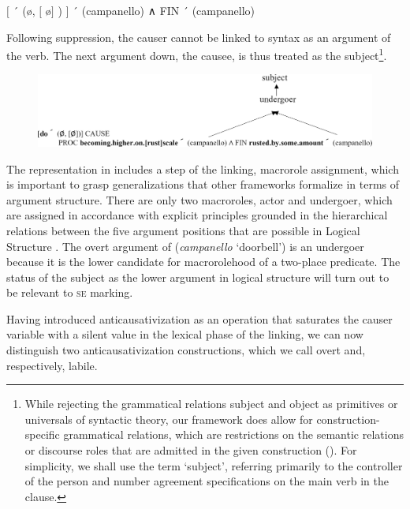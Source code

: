 \documentclass[output=paper,colorlinks,citecolor=brown
]{langscibook}
\begin{document}
\ea  \label{bentley_example_50}
    $\lbrack$ ´ (\o, $\lbrack$ \o $\rbrack$ ) $\rbrack$ ´ (campanello) ∧ FIN ´ (campanello)
\z

Following suppression, the causer cannot be linked to syntax as an argument of the verb. The next argument down, the causee, is thus treated as the subject\footnote{While rejecting the grammatical relations subject and object as primitives or universals of syntactic theory, our framework does allow for construction-specific grammatical relations, which are restrictions on the semantic relations or discourse roles that are admitted in the given construction (\cites[242--309]{vanvalin2023principles}{lapolla2023grammatical}). For simplicity, we shall use the term ‘subject’, referring primarily to the controller of the person and number agreement specifications on the main verb in the clause.}.

\begin{figure}
\includegraphics[width=\textwidth]{figures/bentley_figure3.png}
\caption{}
\label{fig:bentley_figure_3}
\end{figure}    


The representation in  includes a step of the linking, macrorole assignment, which is important to grasp generalizations that other frameworks formalize in terms of argument structure. There are only two macroroles, actor and undergoer, which are assigned in accordance with explicit principles grounded in the hierarchical relations between the five argument positions that are possible in Logical Structure \citep[82--198]{vanvalin1997syntax}. The overt argument of  (\textit{campanello} ‘doorbell’) is an undergoer because it is the lower candidate for macrorolehood of a two-place predicate. The status of the subject as the lower argument in logical structure will turn out to be relevant to \textsc{se} marking. 

\begin{sloppypar}
Having introduced anticausativization as an operation that saturates the causer variable with a silent value in the lexical phase of the linking, we can now distinguish two anticausativization constructions, which we call overt and, respectively, labile. 
\end{sloppypar}
\end{document}
